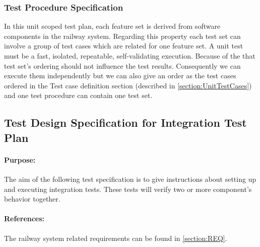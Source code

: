\noindent\subsubsection{Test Procedure Specification}
In this unit scoped test plan, each feature set is derived from software components in the railway system. Regarding this property each test set can involve a group of test cases which are related for one feature set. A unit test must be a fast, isolated, repeatable, self-validating execution. Because of the that test set's ordering should not influence the test results. Consequently we can execute them independently but we can also give an order as the test cases ordered in the Test case definition section (described in \autoref{section:UnitTestCases}) and one test procedure can contain one test set. 

\subsection{Test Design Specification for Integration Test Plan}

\paragraph{Purpose:} The aim of the following test specification is to give instructions about setting up and executing integration tests. These tests will verify two or more component's behavior together.
\paragraph{References:} The railway system related requirements can be found in \autoref{section:REQ}.

